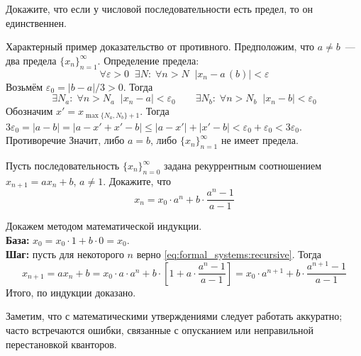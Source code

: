 \begin{Exercise}[counter=SecExercise]
    \noindent
    Докажите, что если у числовой последовательности есть предел, то он единственнен.
\end{Exercise}

\begin{Answer}
    \noindent
    Характерный пример доказательство от противного.
    Предположим, что $ a \neq b $~--- два предела $ \{ x_n \}_{n=1}^{\infty} $.
    Определение предела:
    \[
        \forall \varepsilon > 0 \;\; \exists N: \; \forall n > N \;\; |x_n - a\,(b)| < \varepsilon
    \]
    Возьмём $ \varepsilon_0 = |b - a| / 3 > 0 $.
    Тогда
    \[
        \exists N_a: \; \forall n > N_a \;\; |x_n - a| < \varepsilon_0 \qquad
        \exists N_b: \; \forall n > N_b \;\; |x_n - b| < \varepsilon_0
    \]
    Обозначим $ x' = x_{\max \{N_a, N_b\} + 1} $.
    Тогда $ 3\varepsilon_0 = |a - b| = |a - x' + x' - b| \leqslant |a - x'| + |x' - b| < \varepsilon_0 + \varepsilon_0 <  3 \varepsilon_0 $.
    Противоречие
    Значит, либо $ a = b $, либо $ \{x_n\}_{n=1}^{\infty} $ не имеет предела.
\end{Answer}


\begin{Exercise}[counter=SecExercise]
    \noindent
    Пусть последовательность $ \{ x_n \}_{n=0}^{\infty} $ задана рекуррентным соотношением $ x_{n+1} = a x_n + b $, $ a \neq 1 $.
    Докажите, что
    \begin{equation}
        \label{eq:formal_systems:recursive}
        x_n = x_0 \cdot a^n + b \cdot \frac{a^n - 1}{a - 1}
    \end{equation}
\end{Exercise}

\begin{Answer}
    \noindent
    Докажем методом математической индукции.\\
    \textbf{База:} $ x_0 = x_0 \cdot 1 + b \cdot 0 = x_0 $.\\
    \textbf{Шаг:} пусть для некоторого $ n $ верно \eqref{eq:formal_systems:recursive}.
    Тогда
    \[
        x_{n+1} = a x_n + b = x_0 \cdot a \cdot a^n + b \cdot \left[ 1 + a \cdot \frac{a^n - 1}{a - 1} \right] = x_0 \cdot a^{n+1} + b \cdot \frac{a^{n+1} - 1}{a - 1}
    \]
    Итого, по индукции доказано.
\end{Answer}


Заметим, что с математическими утверждениями следует работать аккуратно;
часто встречаются ошибки, связанные с опусканием или неправильной перестановкой кванторов.

